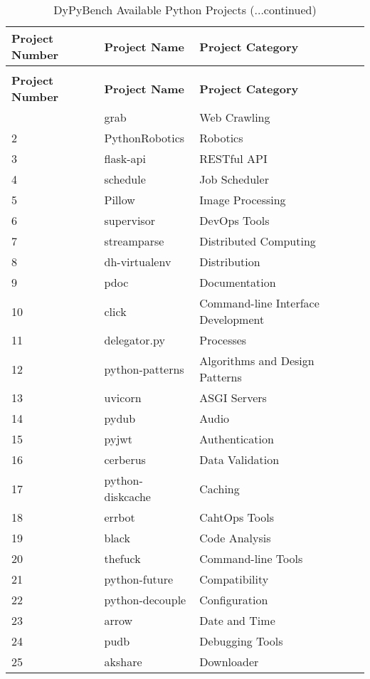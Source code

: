 \centering
\begin{longtable} {|l|l|l|}
    \caption[DyPyBench Available Python Projects]{DyPyBench Available Python Projects \label{table:50_installed_projects}}\\
    \hline
    \textbf{Project Number} & \textbf{Project Name} & \textbf{Project Category}\\
    \hline
    \endfirsthead
    \caption[]{DyPyBench Available Python Projects (...continued)}\\
    \hline
    \textbf{Project Number} & \textbf{Project Name} & \textbf{Project Category}\\
    \hline
    \endhead
    \hline
    \endfoot
    1 & grab & Web Crawling\\
    2 & PythonRobotics & Robotics\\
    3 & flask-api & RESTful API\\
    4 & schedule & Job Scheduler\\
    5 & Pillow & Image Processing\\
    6 & supervisor & DevOps Tools\\
    7 & streamparse & Distributed Computing\\
    8 & dh-virtualenv & Distribution\\
    9 & pdoc & Documentation\\
    10 & click & Command-line Interface Development\\
    11 & delegator.py & Processes\\
    12 & python-patterns & Algorithms and Design Patterns\\
    13 & uvicorn & ASGI Servers\\
    14 & pydub & Audio\\
    15 & pyjwt & Authentication\\
    16 & cerberus & Data Validation\\
    17 & python-diskcache & Caching\\
    18 & errbot & CahtOps Tools\\
    19 & black & Code Analysis\\
    20 & thefuck & Command-line Tools\\
    21 & python-future & Compatibility\\
    22 & python-decouple & Configuration\\
    23 & arrow & Date and Time\\
    24 & pudb & Debugging Tools\\
    25 & akshare & Downloader\\

\end{longtable}
